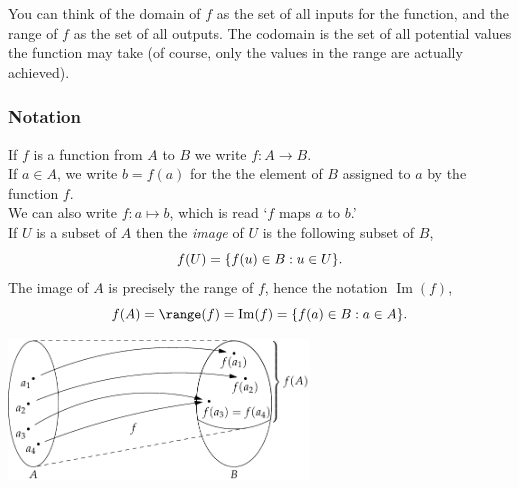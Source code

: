 \noindent You can think of the domain of $f$ as the set of all inputs for the function, and the range of $f$ as the set of all outputs. The codomain is the set of all potential values the function may take (of course, only the values in the range are actually achieved).

\subsubsection*{Notation}

If $f$ is a function from $A$ to $B$ we write $f:A\to B$.\\
If $a\in A$, we write $b=f(a)$ for the the element of $B$ assigned to $a$ by the function $f$.\\
We can also write $f:a\mapsto b$, which is read `$f$ maps $a$ to $b$.'\\
If $U$ is a subset of $A$ then the \emph{image} of $U$ is the following subset of $B$,\vspace{-4pt}
\[f(U)=\{f(u)\in B:u\in U\}.\vspace{-5pt}\]
The image of $A$ is precisely the range of $f$, hence the notation $\operatorname{Im}(f)$,\vspace{-4pt}
\[f(A)=\range(f)=\operatorname{Im}(f)=\{f(a)\in B:a\in A\}.\vspace{-2pt}\]


\begin{center}
\includegraphics[width=0.6\textwidth]{sets-16-funcdef}
\end{center}



